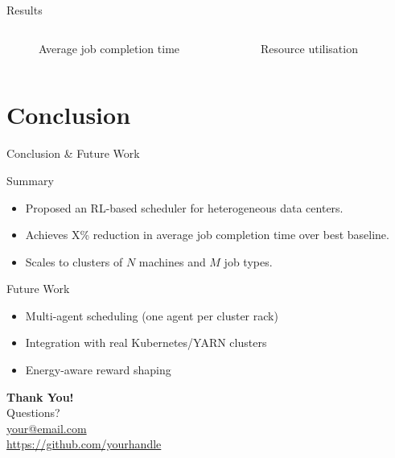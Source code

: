 \documentclass[aspectratio=169]{beamer}  %
\begin{document}
\begin{frame}{Results}
  \begin{columns}
      \begin{figure}
        \centering
        \fbox{\rule{0pt}{3.5cm}\rule{5cm}{0pt}}
        \caption{Average job completion time}
      \end{figure}

      \begin{figure}
        \centering
        \fbox{\rule{0pt}{3.5cm}\rule{5cm}{0pt}}
        \caption{Resource utilisation}
      \end{figure}
  \end{columns}
\end{frame}

\section{Conclusion}

\begin{frame}{Conclusion \& Future Work}
  \begin{block}{Summary}
    \begin{itemize}
      \item Proposed an RL-based scheduler for heterogeneous data centers.
      \item Achieves X\% reduction in average job completion time over best baseline.
      \item Scales to clusters of $N$ machines and $M$ job types.
    \end{itemize}
  \end{block}

  \begin{block}{Future Work}
    \begin{itemize}
      \item Multi-agent scheduling (one agent per cluster rack)
      \item Integration with real Kubernetes/YARN clusters
      \item Energy-aware reward shaping
    \end{itemize}
  \end{block}
\end{frame}

\begin{frame}
  \centering
  \Huge\textbf{Thank You!} \\[1em]
  \large Questions? \\[2em]
  \normalsize
  \href{mailto:your@email.com}{your@email.com} \\
  \url{https://github.com/yourhandle}
\end{frame}
\end{document}
